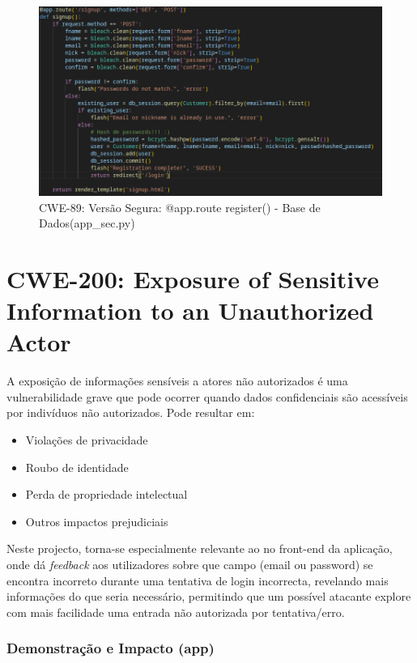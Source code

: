 \begin{figure}[H]
  \centering
  \includegraphics[width=16cm]{images/CWE89-Register-Secure.png}
  \caption{CWE-89: Versão Segura: @app.route register() - Base de Dados(app\_sec.py)}
  \label{fig:cwe89-register-secure}
\end{figure}

%
%
\section{CWE-200: Exposure of Sensitive Information to an Unauthorized Actor}
\label{sec.cwe200}

A exposição de informações sensíveis a atores não autorizados é uma vulnerabilidade grave que pode ocorrer quando dados confidenciais são acessíveis por indivíduos não autorizados. Pode resultar em:

\begin{itemize}
    \item Violações de privacidade 
    \item Roubo de identidade
    \item Perda de propriedade intelectual
    \item Outros impactos prejudiciais
\end{itemize}


Neste projecto, torna-se especialmente relevante ao no front-end da aplicação, onde dá \textit{feedback} aos utilizadores sobre que campo (email ou password) se encontra incorreto durante uma tentativa de login incorrecta, revelando mais informações do que seria necessário, permitindo que um possível atacante explore com mais facilidade uma entrada não autorizada por tentativa/erro. 

\subsubsection{Demonstração e Impacto (app)}

